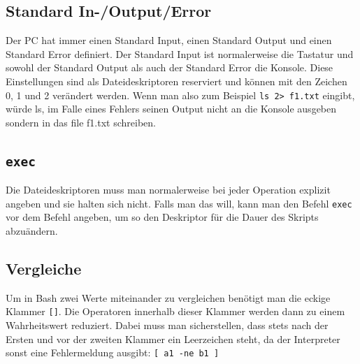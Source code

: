 \documentclass{article}
\begin{document}
	\subsection{Standard In-/Output/Error}
	Der PC hat immer einen Standard Input, einen Standard Output und einen Standard Error definiert. Der Standard Input ist normalerweise die Tastatur und sowohl der Standard Output als auch der Standard Error die Konsole. Diese Einstellungen sind als Dateideskriptoren reserviert und können mit den Zeichen 0, 1 und 2 verändert werden. Wenn man also zum Beispiel \verb|ls 2> f1.txt| eingibt, würde ls, im Falle eines Fehlers seinen Output nicht an die Konsole ausgeben sondern in das file f1.txt schreiben. 
	\cprotect\subsection{\verb|exec|}
	Die Dateideskriptoren muss man normalerweise bei jeder Operation explizit angeben und sie halten sich nicht. Falls man das will, kann man den Befehl \verb|exec| vor dem Befehl angeben, um so den Deskriptor für die Dauer des Skripts abzuändern. 
	\subsection{Vergleiche}
	Um in Bash zwei Werte miteinander zu vergleichen benötigt man die eckige Klammer \verb|[]|. Die Operatoren innerhalb dieser Klammer werden dann zu einem Wahrheitswert reduziert. Dabei muss man sicherstellen, dass stets nach der Ersten und vor der zweiten Klammer ein Leerzeichen steht, da der Interpreter sonst eine Fehlermeldung ausgibt: \verb|[ a1 -ne b1 ]|  
\end{document}
